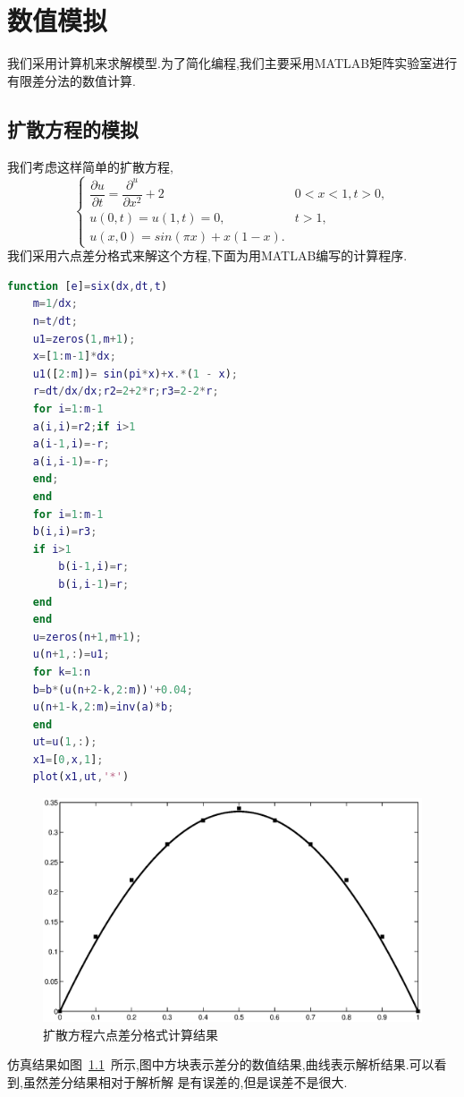 \chapter{数值模拟}
我们采用计算机来求解模型.为了简化编程,我们主要采用MATLAB矩阵实验室进行有限差分法的数值计算.\par
\section{扩散方程的模拟}
我们考虑这样简单的扩散方程,
\begin{equation}
\begin{cases}
\dfrac{\partial u}{\partial t}=\dfrac{\partial^ u}{\partial x^2}+2 & 0<x<1,t>0, \\
u(0,t)=u(1,t)=0,& t>1, \\
u(x,0)=sin(\pi x)+x(1-x).
\end{cases}
\end{equation}
我们采用六点差分格式来解这个方程,下面为用MATLAB编写的计算程序.
 \begin{lstlisting}[caption=六点差分格式,language=Matlab]
function [e]=six(dx,dt,t)
    m=1/dx;
    n=t/dt;
    u1=zeros(1,m+1);
    x=[1:m-1]*dx;
    u1([2:m])= sin(pi*x)+x.*(1 - x);
    r=dt/dx/dx;r2=2+2*r;r3=2-2*r;
    for i=1:m-1
	a(i,i)=r2;if i>1
	a(i-1,i)=-r;
	a(i,i-1)=-r;
	end;
    end
    for i=1:m-1
	b(i,i)=r3;
	if i>1
	    b(i-1,i)=r;
	    b(i,i-1)=r;
	end
    end
    u=zeros(n+1,m+1);
    u(n+1,:)=u1;
    for k=1:n
	b=b*(u(n+2-k,2:m))'+0.04;
	u(n+1-k,2:m)=inv(a)*b;
    end
    ut=u(1,:);
    x1=[0,x,1];
    plot(x1,ut,'*')
\end{lstlisting}
\begin{figure}[h]
 \centering
 \includegraphics[scale=0.65]{./pic/6dcf.eps}
 \caption{扩散方程六点差分格式计算结果\label{fig:sm_ldcf}}
\end{figure}\par
仿真结果如图~\ref{fig:sm_ldcf}~所示,图中方块表示差分的数值结果,曲线表示解析结果.可以看到,虽然差分结果相对于解析解
是有误差的,但是误差不是很大.\newpage
